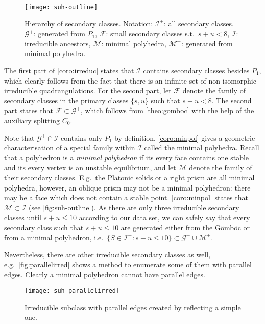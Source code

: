 \documentclass[]{article}
\newcommand{\suh}{$\mathcal{I}^+$\xspace}
\newcommand{\suhm}{\mathcal{I}^+}
\newcommand{\col}{$\mathcal{G}^+$\xspace}
\newcommand{\colm}{\mathcal{G}^+}
\newcommand{\Gomboc}{Gömböc\xspace}
\begin{document}
\begin{figure}
  \centering
  \texttt{[image: suh-outline]}
  \caption{Hierarchy of secondary classes.
    Notation: \suh: all secondary classes,
    \col: generated from $P_1$,
    $\mathcal{F}$: small secondary classes s.t.~$s+u<8$,
    $\mathcal{I}$: irreducible ancestors,
    $\mathcal{M}$: minimal polyhedra,
    $\mathcal{M}^+$: generated from minimal polyhedra.}
\label{fig:suh-outline}
\end{figure}

The first part of \autoref{coro:irreduc} states that $\mathcal{I}$ contains secondary classes besides $P_1$, which clearly follows from the fact that there is an infinite set of non-isomorphic irreducible quadrangulations.
For the second part, let $\mathcal{F}$ denote the family of secondary classes in the primary classes $\{s,u\}$ such that $s+u<8$.
The second part states that $\mathcal{F}\subset\colm$, which follows from \autoref{theo:gomboc} with the help of the auxiliary splitting $C_0$. 

Note that $\colm\cap\mathcal{I}$ contains only $P_1$ by definition.
\autoref{coro:minpol} gives a geometric characterisation of a special family within $\mathcal{I}$ called the minimal polyhedra.
Recall that a polyhedron is a \emph{minimal polyhedron} if its every face contains one stable and its every vertex is an unstable equilibrium, and let $\mathcal{M}$ denote the family of their secondary classes.
E.g.\  the Platonic solids or a right prism are all minimal polyhedra, however, an oblique prism may not be a minimal polyhedron: there may be a face which does
not contain a stable point.
\autoref{coro:minpol} states that $\mathcal{M}\subset\mathcal{I}$  (see \autoref{fig:suh-outline}).
As there are only three irreducible secondary classes until $s+u\leq 10$ according to our data set, we can safely say that every secondary class such that $s+u\leq 10$ are generated either from the \Gomboc or from a minimal polyhedron, i.e.\  $\{S\in\suhm:s+u\leq 10\}\subset\colm\cup\mathcal{M}^+$.

Nevertheless, there are other irreducible secondary classes as well, e.g.\  \autoref{fig:parallelirred} shows a method to enumerate some of them with parallel edges.
Clearly a minimal polyhedron cannot have parallel edges.

\begin{figure}
\centering
\texttt{[image: suh-parallelirred]}
\caption{Irreducible subclass with parallel edges created by reflecting a simple one.}
\label{fig:parallelirred}
\end{figure}
\end{document}
